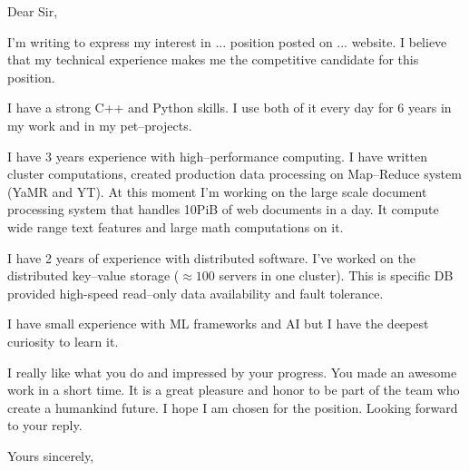 \documentclass{letter}
\begin{document}
\begin{letter}
\newline
\opening{Dear Sir,}

I'm writing to express my interest in ... position posted on ... website.
I believe that my technical experience makes me the competitive candidate for this position.

I have a strong C++ and Python skills. I use both of it every day for 6 years in my work and in my pet--projects.

I have 3 years experience with high--performance computing.
I have written cluster computations, created production data processing on Map--Reduce system (YaMR and YT).
At this moment I'm working on the large scale document processing system that handles 10PiB of web documents in a day.
It compute wide range text features and large math computations on it.

I have 2 years of experience with distributed software.
I've worked on the distributed key--value storage ($\approx100$ servers in one cluster).
This is specific DB provided high-speed read--only data availability and fault tolerance.

I have small experience with ML frameworks and AI but I have the deepest curiosity to learn it.

I really like what you do and impressed by your progress. You made an awesome work in a short time.
It is a great pleasure and honor to be part of the team who create a humankind future.
I hope I am chosen for the position.
Looking forward to your reply.

\closing{Yours sincerely,}
\end{letter}
\end{document}
